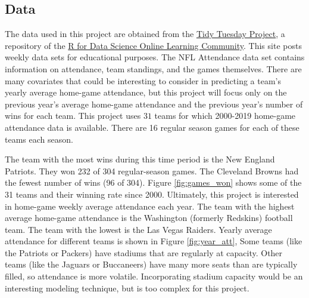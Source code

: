 \documentclass[11pt]{article}
\begin{document}
\vspace*{-.5\baselineskip}
\subsection{Data}

The data used in this project are obtained from the \href{https://github.com/rfordatascience/tidytuesday/blob/master/data/2020/2020-02-04}{Tidy Tuesday Project}, a repository of the \href{https://www.rfordatasci.com/}{R for Data Science Online Learning Community}. This site posts weekly data sets for educational purposes. The NFL Attendance data set contains information on attendance, team standings, and the games themselves. There are many covariates that could be interesting to consider in predicting a team's yearly average home-game attendance, but this project will focus only on the previous year's average home-game attendance and the previous year's number of wins for each team. This project uses $31$ teams for which 2000-2019 home-game attendance data is available. There are 16 regular season games for each of these teams each season.

The team with the most wins during this time period is the New England Patriots. They won 232 of 304 regular-season games. The Cleveland Browns had the fewest number of wins (96 of 304). Figure \ref{fig:games_won} shows some of the 31 teams and their winning rate since 2000. Ultimately, this project is interested in home-game weekly average attendance each year. The team with the highest average home-game attendance is the Washington (formerly Redskins) football team. The team with the lowest is the Las Vegas Raiders. Yearly average attendance for different teams is shown in Figure \ref{fig:year_att}, Some teams (like the Patriots or Packers) have stadiums that are regularly at capacity. Other teams (like the Jaguars or Buccaneers) have many more seats than are typically filled, so attendance is more volatile. Incorporating stadium capacity would be an interesting modeling technique, but is too complex for this project.
\end{document}
